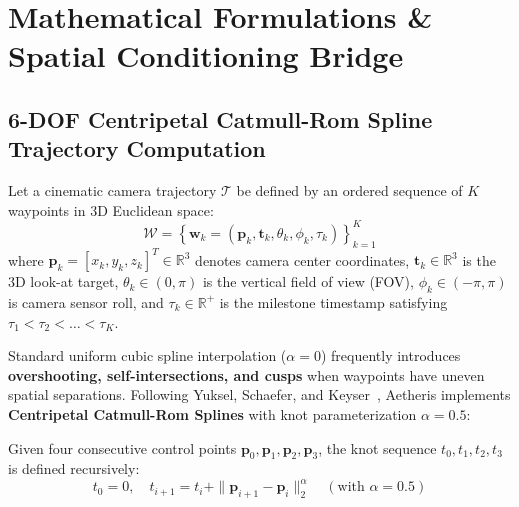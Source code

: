 \documentclass[10pt,twocolumn,letterpaper]{article}
\begin{document}
\section{Mathematical Formulations \& Spatial Conditioning Bridge}

\subsection{6-DOF Centripetal Catmull-Rom Spline Trajectory Computation}

Let a cinematic camera trajectory $\mathcal{T}$ be defined by an ordered sequence of $K$ waypoints in 3D Euclidean space:
\begin{equation}
\mathcal{W} = \left\{ \mathbf{w}_k = (\mathbf{p}_k, \mathbf{t}_k, \theta_k, \phi_k, \tau_k) \right\}_{k=1}^K
\end{equation}
where $\mathbf{p}_k = [x_k, y_k, z_k]^T \in \mathbb{R}^3$ denotes camera center coordinates, $\mathbf{t}_k \in \mathbb{R}^3$ is the 3D look-at target, $\theta_k \in (0, \pi)$ is the vertical field of view (FOV), $\phi_k \in (-\pi, \pi)$ is camera sensor roll, and $\tau_k \in \mathbb{R}^+$ is the milestone timestamp satisfying $\tau_1 < \tau_2 < \dots < \tau_K$.

Standard uniform cubic spline interpolation ($\alpha = 0$) frequently introduces \textbf{overshooting, self-intersections, and cusps} when waypoints have uneven spatial separations. Following Yuksel, Schaefer, and Keyser~\cite{yuksel2011parameterization}, Aetheris implements \textbf{Centripetal Catmull-Rom Splines} with knot parameterization $\alpha = 0.5$:

Given four consecutive control points $\mathbf{p}_0, \mathbf{p}_1, \mathbf{p}_2, \mathbf{p}_3$, the knot sequence $t_0, t_1, t_2, t_3$ is defined recursively:
\begin{equation}
t_0 = 0, \quad t_{i+1} = t_i + \|\mathbf{p}_{i+1} - \mathbf{p}_i\|_2^\alpha \quad (\text{with } \alpha = 0.5)
\end{equation}
\end{document}
